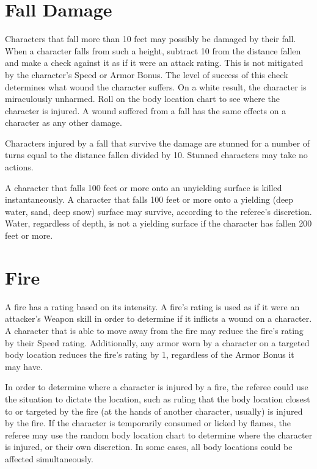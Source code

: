 \documentclass[oneside]{book}
\begin{document}
\begin{multicols}{2}

\section{Fall Damage}

Characters that fall more than 10 feet may possibly be damaged by their fall. When a character falls from such a height, subtract 10 from the distance fallen and make a check against it as if it were an attack rating. This is not mitigated by the character's Speed or Armor Bonus. The level of success of this check determines what wound the character suffers. On a white result, the character is miraculously unharmed. Roll on the body location chart to see where the character is injured. A wound suffered from a fall has the same effects on a character as any other damage. 

Characters injured by a fall that survive the damage are stunned for a number of turns equal to the distance fallen divided by 10. Stunned characters may take no actions. 

A character that falls 100 feet or more onto an unyielding surface is killed instantaneously. A character that falls 100 feet or more onto a yielding (deep water, sand, deep snow) surface may survive, according to the referee's discretion. Water, regardless of depth, is not a yielding surface if the character has fallen 200 feet or more. 

\section{Fire}

A fire has a rating based on its intensity. A fire's rating is used as if it were an attacker's Weapon skill in order to determine if it inflicts a wound on a character. A character that is able to move away from the fire may reduce the fire's rating by their Speed rating. Additionally, any armor worn by a character on a targeted body location reduces the fire's rating by 1, regardless of the Armor Bonus it may have. 

In order to determine where a character is injured by a fire, the referee could use the situation to dictate the location, such as ruling that the body location closest to or targeted by the fire (at the hands of another character, usually) is injured by the fire. If the character is temporarily consumed or licked by flames, the referee may use the random body location chart to determine where the character is injured, or their own discretion. In some cases, all body locations could be affected simultaneously.


\end{multicols}
\end{document}
